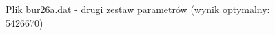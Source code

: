 \documentclass[12pt]{article}
\begin{document}
\begin{figure}
\caption[Podpis_do_spisu]{Plik bur26a.dat - drugi zestaw parametrów (wynik optymalny: 5426670)}
\end{figure}
\end{document}
